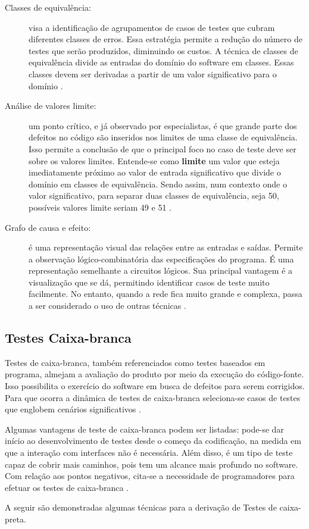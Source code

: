 \begin{description}
\item[Classes de equivalência:] visa a identificação de agrupamentos de casos de testes que cubram diferentes classes de erros. Essa estratégia permite a redução do número de testes que serão produzidos, diminuindo os custos. A técnica de classes de equivalência divide as entradas do domínio do software em classes. Essas classes devem ser derivadas a partir de um valor significativo para o domínio \cite{williams2006}.
\item[Análise de valores limite:] um ponto crítico, e já observado por especialistas, é que grande parte dos defeitos no código são inseridos nos limites de uma classe de equivalência. Isso permite a conclusão de que o principal foco no caso de teste deve ser sobre os valores limites. Entende-se como \textbf{limite} um valor que esteja imediatamente próximo ao valor de entrada significativo que divide o domínio em classes de equivalência. Sendo assim, num contexto onde o valor significativo, para separar duas classes de equivalência, seja 50, possíveis valores limite seriam 49 e 51 \cite{williams2006}.
\item[Grafo de causa e efeito:] é uma representação visual das relações entre as entradas e saídas. Permite a observação lógico-combinatória das especificações do programa. É uma representação semelhante a circuitos lógicos. Sua principal vantagem é a visualização que se dá, permitindo identificar casos de teste muito facilmente. No entanto, quando a rede fica muito grande e complexa, passa a ser considerado o uso de outras técnicas \cite{barbosaEtAl2009}.
\end{description}


\subsection{Testes Caixa-branca}
Testes de caixa-branca, também referenciados como testes baseados em programa, almejam a avaliação do produto por meio da execução do código-fonte. Isso possibilita o exercício do software em busca de defeitos para serem corrigidos. Para que ocorra a dinâmica de testes de caixa-branca seleciona-se casos de testes que englobem cenários significativos \cite{barbosaEtAl2009}.
\par
\indent Algumas vantagens de teste de caixa-branca podem ser listadas: pode-se dar início ao desenvolvimento de testes desde o começo da codificação, na medida em que a interação com interfaces não é necessária. Além disso, é um tipo de teste capaz de cobrir mais caminhos, pois tem um alcance mais profundo no software. Com relação aos pontos negativos, cita-se a necessidade de programadores para efetuar os testes de caixa-branca \cite{barbosaEtAl2009}.
\par
\indent A seguir são demonstradas algumas técnicas para a derivação de Testes de caixa-preta.

